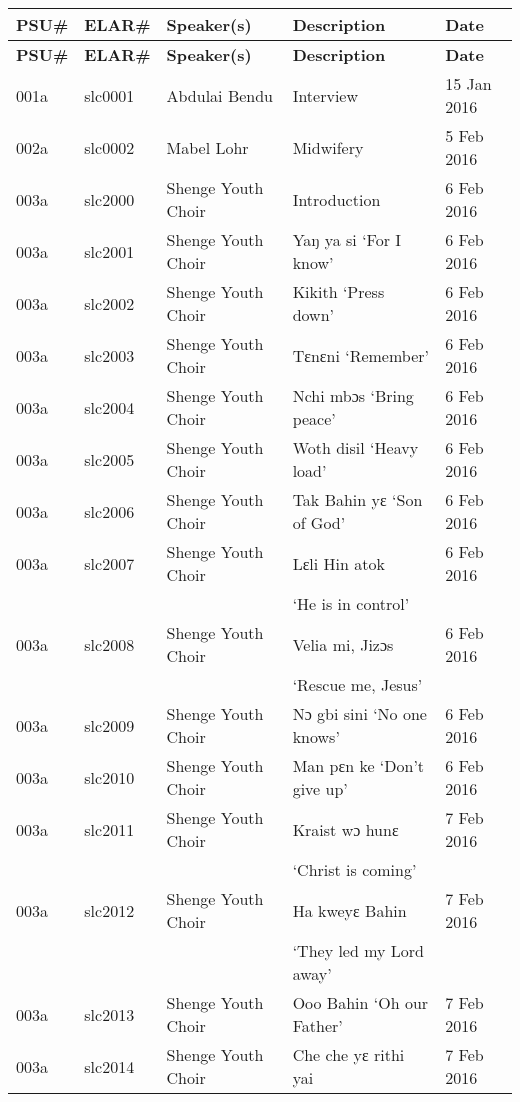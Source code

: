 \begin{xltabular}{\textwidth}{lllQl}
\lsptoprule
		\textbf{PSU\#} & \textbf{ELAR\#} & \textbf{Speaker(s)} & \textbf{Description} & \textbf{Date}\\
		\midrule\endfirsthead
 \midrule
 \textbf{PSU\#} & \textbf{ELAR\#} & \textbf{Speaker(s)} & \textbf{Description} & \textbf{Date}\\
		\midrule\endhead
 \midrule\endfoot
 \lspbottomrule
 \endlastfoot
 
001a & slc0001 & Abdulai Bendu & Interview & 15 Jan 2016\\
002a & slc0002 & Mabel Lohr & Midwifery & 5 Feb 2016\\
003a & slc2000 & Shenge Youth Choir & Introduction & 6 Feb 2016\\
003a & slc2001 & Shenge Youth Choir & Yaŋ ya si ‘For I know' & 6 Feb 2016\\
003a & slc2002 & Shenge Youth Choir & Kikith ‘Press down' & 6 Feb 2016\\
003a & slc2003 & Shenge Youth Choir & Tɛnɛni ‘Remember' & 6 Feb 2016\\
003a & slc2004 & Shenge Youth Choir & Nchi mbɔs ‘Bring peace' & 6 Feb 2016\\
003a & slc2005 & Shenge Youth Choir & Woth disil ‘Heavy load' & 6 Feb 2016\\
003a & slc2006 & Shenge Youth Choir & Tak Bahin yɛ ‘Son of God' & 6 Feb 2016\\
003a & slc2007 & Shenge Youth Choir & Lɛli Hin atok & 6 Feb 2016\\
& & & ‘He is in control' & \\
003a & slc2008 & Shenge Youth Choir & Velia mi, Jizɔs & 6 Feb 2016\\
& & & ‘Rescue me, Jesus' & \\
003a & slc2009 & Shenge Youth Choir & Nɔ gbi sini ‘No one knows' & 6 Feb 2016\\
003a & slc2010 & Shenge Youth Choir & Man pɛn ke ‘Don't give up' & 6 Feb 2016\\
003a & slc2011 & Shenge Youth Choir & Kraist wɔ hunɛ & 7 Feb 2016\\
& & & ‘Christ is coming' & \\
003a & slc2012 & Shenge Youth Choir & Ha kweyɛ Bahin & 7 Feb 2016\\
& & & ‘They led my Lord away' & \\
003a & slc2013 & Shenge Youth Choir & Ooo Bahin ‘Oh our Father' & 7 Feb 2016\\
003a & slc2014 & Shenge Youth Choir & Che che yɛ rithi yai & 7 Feb 2016\\

\end{xltabular}
